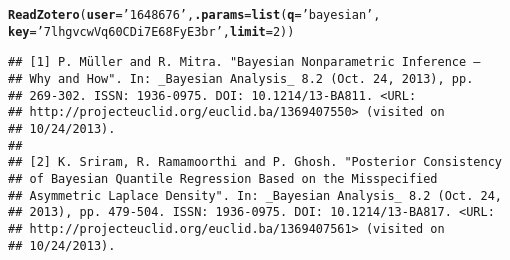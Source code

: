 \documentclass[article]{jss}\usepackage[]{graphicx}\usepackage[]{color}
\makeatletter
\newcommand{\hlnum}[1]{\textcolor[rgb]{0.125,0.125,1}{#1}}%
\newcommand{\hlstr}[1]{\textcolor[rgb]{0.125,0.125,1}{#1}}%
\newcommand{\hlstd}[1]{\textcolor[rgb]{0.251,0.251,0.282}{#1}}%
\newcommand{\hlkwc}[1]{\textcolor[rgb]{0.529,0,0.184}{\textbf{#1}}}%
\newcommand{\hlkwd}[1]{\textcolor[rgb]{0.251,0.251,0.282}{\textbf{#1}}}%
\newenvironment{kframe}{%
 \def\at@end@of@kframe{}%
 \ifinner\ifhmode%
  \def\at@end@of@kframe{\end{minipage}}%
  \begin{minipage}{\columnwidth}%
 \fi\fi%
 \def\FrameCommand##1{\hskip\@totalleftmargin \hskip-\fboxsep
 \colorbox{shadecolor}{##1}\hskip-\fboxsep
     \hskip-\linewidth \hskip-\@totalleftmargin \hskip\columnwidth}%
 \MakeFramed {\advance\hsize-\width
   \@totalleftmargin\z@ \linewidth\hsize
   \@setminipage}}%
 {\par\unskip\endMakeFramed%
 \at@end@of@kframe}
\newenvironment{knitrout}{}{} %
\makeatother
\begin{document}
\begin{knitrout}
\color{fgcolor}\begin{kframe}
\begin{alltt}
\hlkwd{ReadZotero}\hlstd{(}\hlkwc{user} \hlstd{=} \hlstr{'1648676'}\hlstd{,} \hlkwc{.params} \hlstd{=} \hlkwd{list}\hlstd{(}\hlkwc{q} \hlstd{=} \hlstr{'bayesian'}\hlstd{,}
                               \hlkwc{key} \hlstd{=} \hlstr{'7lhgvcwVq60CDi7E68FyE3br'}\hlstd{,} \hlkwc{limit} \hlstd{=} \hlnum{2}\hlstd{))}
\end{alltt}
\begin{verbatim}
## [1] P. Müller and R. Mitra. "Bayesian Nonparametric Inference –
## Why and How". In: _Bayesian Analysis_ 8.2 (Oct. 24, 2013), pp.
## 269-302. ISSN: 1936-0975. DOI: 10.1214/13-BA811. <URL:
## http://projecteuclid.org/euclid.ba/1369407550> (visited on
## 10/24/2013).
## 
## [2] K. Sriram, R. Ramamoorthi and P. Ghosh. "Posterior Consistency
## of Bayesian Quantile Regression Based on the Misspecified
## Asymmetric Laplace Density". In: _Bayesian Analysis_ 8.2 (Oct. 24,
## 2013), pp. 479-504. ISSN: 1936-0975. DOI: 10.1214/13-BA817. <URL:
## http://projecteuclid.org/euclid.ba/1369407561> (visited on
## 10/24/2013).
\end{verbatim}
\end{kframe}
\end{knitrout}
\end{document}
